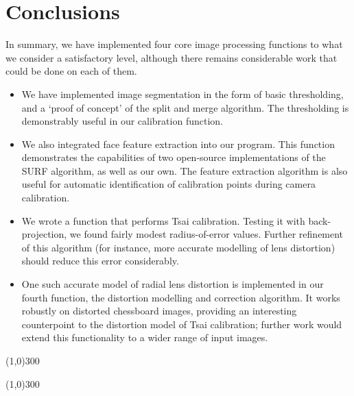 
\section{Conclusions}
\label{sec:conclusions}

In summary, we have implemented four core image processing functions to what we consider a satisfactory level, although there remains considerable work that could be done on each of them.
\begin{itemize}
  \item We have implemented image segmentation in the form of basic thresholding, and a `proof of concept' of the split and merge algorithm. The thresholding is demonstrably useful in our calibration function.
  \item We also integrated face feature extraction into our program. This function demonstrates the capabilities of two open-source implementations of the SURF algorithm, as well as our own. The feature extraction algorithm is also useful for automatic identification of calibration points during camera calibration.
  \item We wrote a function that performs Tsai calibration. Testing it with back-projection, we found fairly modest radius-of-error values. Further refinement of this algorithm (for instance, more accurate modelling of lens distortion) should reduce this error considerably.
  \item One such accurate model of radial lens distortion is implemented in our fourth function, the distortion modelling and correction algorithm. It works robustly on distorted chessboard images, providing an interesting counterpoint to the distortion model of Tsai calibration; further work would extend this functionality to a wider range of input images.
\end{itemize}

\begin{center}
\line(1,0){300}
\end{center}

\begin{center}
\line(1,0){300}
\end{center}